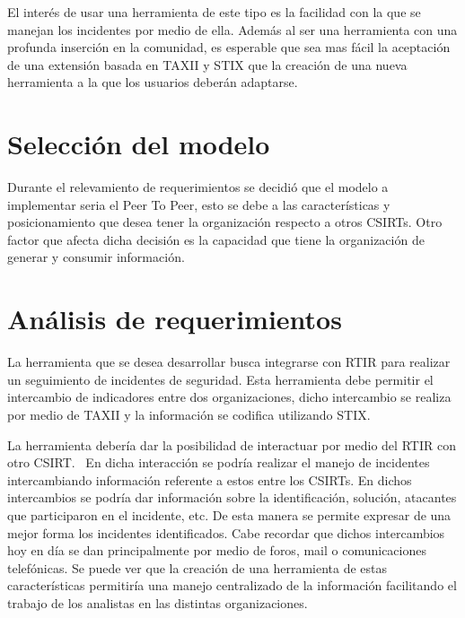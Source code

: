 \documentclass[11pt]{article}
\begin{document}
\bigskip

El interés de usar una herramienta de este tipo es la facilidad con la que se manejan los incidentes por medio de ella. Además al ser una herramienta con una profunda inserción en la comunidad, es esperable que sea mas fácil la aceptación de una extensión basada en TAXII y STIX que la creación de una nueva herramienta a la que los usuarios deberán adaptarse.


\bigskip

\section[Selección del modelo]{Selección del modelo}

\bigskip

Durante el relevamiento de requerimientos se decidió que el modelo a implementar seria el Peer To Peer, esto se debe a las características y posicionamiento que desea tener la organización respecto a otros CSIRTs. Otro factor que afecta dicha decisión es la capacidad que tiene la organización de generar y consumir información.

\section[Análisis de requerimientos]{Análisis de requerimientos}
La herramienta que se desea desarrollar busca integrarse con RTIR para realizar un seguimiento de incidentes de seguridad. Esta herramienta debe permitir el intercambio de indicadores entre dos organizaciones, dicho intercambio se realiza por medio de TAXII y la información se codifica utilizando STIX. 


\bigskip

La herramienta debería dar la posibilidad de interactuar por medio del RTIR con otro CSIRT. \ En dicha interacción se podría realizar el manejo de incidentes intercambiando información referente a estos entre los CSIRTs. En dichos intercambios se podría dar información sobre la identificación, solución, atacantes que participaron en el incidente, etc. De esta manera se permite expresar de una mejor forma los incidentes identificados. Cabe recordar que dichos intercambios hoy en día se dan principalmente por medio de foros, mail o comunicaciones telefónicas. Se puede ver que la creación de una herramienta de estas características permitiría una manejo centralizado de la información facilitando el trabajo de los analistas en las distintas organizaciones.
\end{document}
